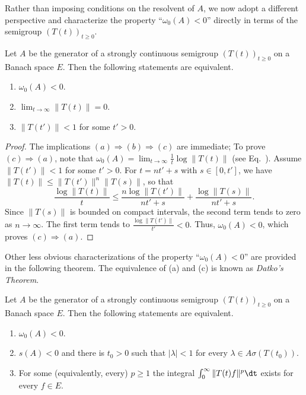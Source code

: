 Rather than imposing conditions on the resolvent of\/ $ A $, we now adopt a different perspective and characterize the property \enquote{$ \omega_{0}(A) < 0 $} directly in terms of the semigroup $ (T(t))_{t \geq 0} $.
\begin{proposition} \label{prop:a4-1.10} 
Let $ A $ be the generator of a strongly continuous semigroup $ (T(t))_{t \geq 0} $ on a Banach space $E$. 
Then the following statements are equivalent.
\begin{enumerate}[\upshape (a)]
\item  
$ \omega_{0}(A) < 0 $.
\item  
$ \lim_{t \to \infty} \| T(t) \| = 0 $.
\item  
$ \| T(t') \| < 1 $ for some $ t' > 0 $.
\end{enumerate}
\end{proposition}
\begin{proof}
The implications $(a)  \Rightarrow  (b)  \Rightarrow  (c) $ are immediate; To prove $(c)  \Rightarrow  (a) $, note that $\omega_{0}(A) = \lim_{t \to \infty} \frac{1}{t} \log \| T(t) \|$ (see Eq.~). Assume $\|T(t')\| <1$ for some $t'>0$. For $t=nt'+s$ with $s\in [0,t']$, we have $\|T(t)\|\le \|T(t')\|^n\|T(s)\|$, so that
\[
\displaystyle
\frac{\log \|T(t)\|}{t} \leq \frac{n\log \|T(t')\|}{nt'+s} + \frac{\log \|T(s)\|}{nt' + s}.
\]
Since $\|T(s)\|$ is bounded on compact intervals, the second term tends to zero as $n\to\infty$. The first term tends to $\frac{\log \|T(t')\|}{t'} < 0$. Thus, $\omega_0(A) < 0$, which proves  $(c)  \Rightarrow  (a) $.
\end{proof}
Other less obvious characterizations of the property 
\enquote{$ \omega_{0}(A) < 0 $} are provided in the following theorem. 
The equivalence of (a) and (c) is known as \emph{Datko’s Theorem}.
\begin{theorem} \label{thm:a4-1.11} 
Let $ A $ be the generator of a strongly continuous semigroup $ (T(t))_{t \geq 0} $ on a Banach space $ E $. 
Then the following statements are equivalent.
\begin{enumerate}[\upshape (a)]
\item
$ \omega_{0}(A) < 0 $.
\item
$ s(A) < 0 $ and there is $ t_0 > 0 $ such that  
$ |\lambda| < 1$ for every $ \lambda \in A\sigma (T(t_0)).$
\item
For some (equivalently, every) $ p \geq 1 $ the integral $ \int_{0}^{\infty} \| T(t) f \|^p\dt $ exists for every $ f \in E $.
\end{enumerate}
\end{theorem}
